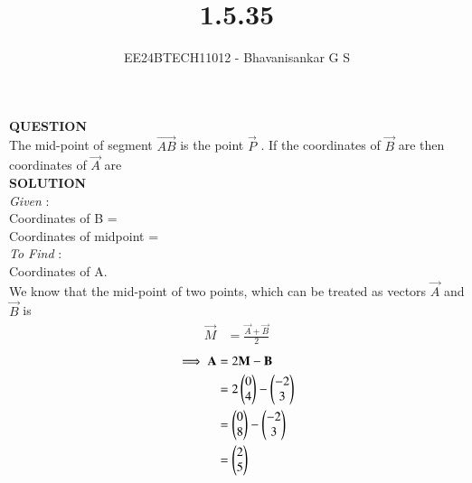 \documentclass[journal]{IEEEtran}
\begin{document}

\vspace{3cm}

\title{1.5.35}
\author{EE24BTECH11012 - Bhavanisankar G S}
{\let\newpage\relax\maketitle}

\renewcommand{\thefigure}{\theenumi}
\renewcommand{\thetable}{\theenumi}
\setlength{\intextsep}{10pt} %


\renewcommand{\thetable}{\theenumi}

\textbf{QUESTION} \\
The mid-point of segment $\vec{AB}$ is the point $\vec{P}$  . If the coordinates of $\vec{B}$ are  then coordinates of $\vec{A}$ are \hfill {} \\
\textbf{SOLUTION} \\
\emph{Given} : \\
Coordinates of B =  \\
Coordinates of midpoint   =  \\
\emph{To Find} : \\
Coordinates of A. \\
We know that the mid-point of two points, which can be treated as vectors $\vec{A}$ and $\vec{B}$ is 
\begin{equation}
	\label{eq1}
	\begin{split}
	 \vec{M} &= \frac{\vec{A} + \vec{B}}{2} 
	\end{split}
\end{equation}
\begin{equation}
	\begin{split}
		\implies \mathbf{A} &= 2\mathbf{M} - \mathbf{B} \\
 &= 2\begin{pmatrix} 0 \\ 4 \end{pmatrix} - \begin{pmatrix}-2 \\ 3 \end{pmatrix} \\
 &= \begin{pmatrix}0 \\ 8\end{pmatrix} - \begin{pmatrix}-2 \\ 3\end{pmatrix} \\
		&= \begin{pmatrix}2 \\ 5\end{pmatrix} 
	\end{split}
\end{equation}
\end{document}
